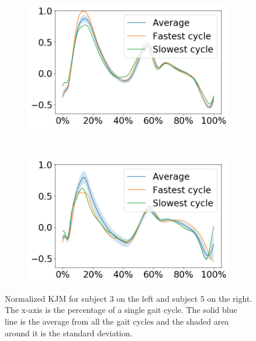 \begin{figure}[ht!]
     \centering
     \begin{subfigure}[b]{0.4\textwidth}
         \centering
         \includegraphics[width=\textwidth]{img/results/moment_avg/subject03_all_set1_moment_avg_w_minmax.png}
     \end{subfigure}
     ~
     \begin{subfigure}[b]{0.4\textwidth}
         \centering
         \includegraphics[width=\textwidth]{img/results/moment_avg/subject05_all_set1_moment_avg_w_minmax.png}
     \end{subfigure}
    \caption{Normalized \ac{KJM} for subject 3 on the left and subject 5 on the right. The x-axis is the percentage of a single gait cycle. The solid blue line is the average from all the gait cycles and the shaded area around it is the standard deviation.}
    \label{fig:A-kjm-average}
\end{figure}
